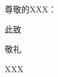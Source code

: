 \documentclass[12pt]{article}
\begin{document}







{\Large \noindent 尊敬的XXX：}

\vspace{1em}
\large 
\setlength\parindent{2em}


\vspace{2em}

此致

\noindent 敬礼

\vspace{2em}

\begin{flushright}
XXX

\zhtoday
\end{flushright}

\end{document}

